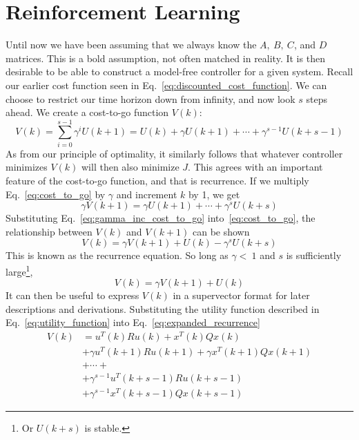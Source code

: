 \FloatBarrier\section{Reinforcement Learning} %
Until now we have been assuming that we always know the $A,\ B,\ C$, and $D$ matrices. This is a bold assumption, not often matched in reality. It is then desirable to be able to construct a model-free controller for a given system.
Recall our earlier cost function seen in Eq.~\ref{eq:discounted_cost_function}. We can choose to restrict our time horizon down from infinity, and now look $s$ steps ahead. We create a cost-to-go function $V(k)$:
\begin{equation}
    V\left(k\right)=\sum_{i=0}^{s-1}{\gamma^i U\left(k+1\right)=U\left(k\right)+\gamma U\left(k+1\right)+\cdots+\gamma^{s-1}U\left(k+s-1\right)}
    \label{eq:cost_to_go}
\end{equation}
As from our principle of optimality, it similarly follows that whatever controller minimizes $V\left(k\right)$ will then also minimize $J$. This agrees with an important feature of the cost-to-go function, and that is recurrence. If we multiply Eq.~\ref{eq:cost_to_go} by $\gamma$ and increment $k$ by 1, we get
\begin{equation}
    \gamma V\left(k+1\right)=\gamma U\left(k+1\right)+\cdots+\gamma^s U\left(k+s\right)
    \label{eq:gamma_inc_cost_to_go}
\end{equation}
Substituting Eq.~\ref{eq:gamma_inc_cost_to_go} into~\ref{eq:cost_to_go}, the relationship between $V\left(k\right)$ and $V\left(k+1\right)$ can be shown
\begin{equation}
    V\left(k\right)=\gamma V\left(k+1\right)+U\left(k\right)-\gamma^s U\left(k+s\right)
    \label{eq:expanded_recurrence}
\end{equation}
This is known as the recurrence equation. So long as $\gamma<\ 1$ and $s$ is sufficiently large\footnote{Or $U(k+s)$ is stable.},
\begin{equation}
    V\left(k\right)=\gamma V\left(k+1\right)+U\left(k\right)
    \label{eq:recurrence}
\end{equation}
It can then be useful to express $V\left(k\right)$ in a supervector format for later descriptions and derivations. Substituting the utility function described in Eq.~\ref{eq:utility_function} into Eq.~\ref{eq:expanded_recurrence}
\begin{equation}
    \begin{split}
        V\left(k\right)&=u^T\left(k\right)Ru\left(k\right)+x^T\left(k\right)Qx\left(k\right) \\
        &+\gamma u^T\left(k+1\right)Ru\left(k+1\right)+\gamma x^T\left(k+1\right)Qx\left(k+1\right) \\
        & + \cdots + \\
        &+\gamma^{s-1}u^T\left(k+s-1\right)Ru\left(k+s-1\right) \\
        &+\gamma^{s-1}x^T\left(k+s-1\right)Qx\left(k+s-1\right)
    \end{split}
    \label{eq:supervector_expanded_ctg}
\end{equation}
